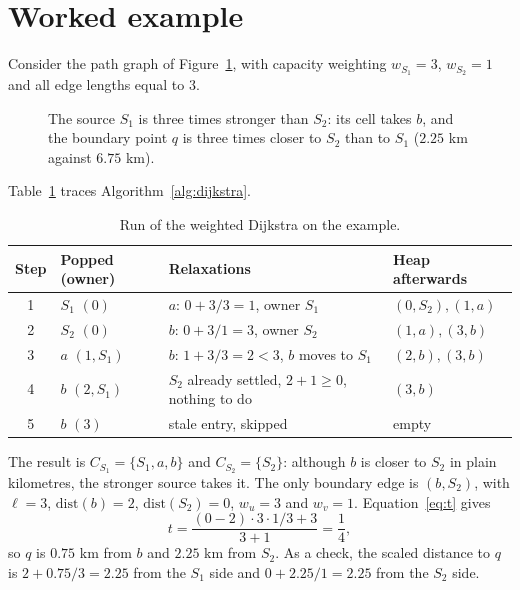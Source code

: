 \documentclass[11pt,a4paper]{article}
\theoremstyle{remark}
\newcommand{\dist}{\mathrm{dist}}
\begin{document}
\section{Worked example}

Consider the path graph of Figure~\ref{fig:example}, with capacity weighting
$w_{S_1}=3$, $w_{S_2}=1$ and all edge lengths equal to $3$.

\begin{figure}[H]
\centering
{}
\caption{The source $S_1$ is three times stronger than $S_2$: its cell takes
$b$, and the boundary point $q$ is three times closer to $S_2$ than to $S_1$
($2.25$ km against $6.75$ km).}
\label{fig:example}
\end{figure}

Table~\ref{tab:run} traces Algorithm~\ref{alg:dijkstra}.

\begin{table}[H]
\centering
\begin{tabular}{@{}clll@{}}
\toprule
Step & Popped (owner) & Relaxations & Heap afterwards \\
\midrule
1 & $S_1$ $(0)$         & $a$: $0+3/3=1$, owner $S_1$                    & $(0,S_2), (1,a)$ \\
2 & $S_2$ $(0)$         & $b$: $0+3/1=3$, owner $S_2$                    & $(1,a), (3,b)$ \\
3 & $a$ $(1, S_1)$      & $b$: $1+3/3=2<3$, $b$ moves to $S_1$            & $(2,b), (3,b)$ \\
4 & $b$ $(2, S_1)$      & $S_2$ already settled, $2+1\ge 0$, nothing to do & $(3,b)$ \\
5 & $b$ $(3)$           & stale entry, skipped                           & empty \\
\bottomrule
\end{tabular}
\caption{Run of the weighted Dijkstra on the example.}
\label{tab:run}
\end{table}

The result is $C_{S_1}=\{S_1,a,b\}$ and $C_{S_2}=\{S_2\}$: although $b$ is
closer to $S_2$ in plain kilometres, the stronger source takes it. The only
boundary edge is $(b,S_2)$, with $\ell=3$, $\dist(b)=2$, $\dist(S_2)=0$,
$w_u=3$ and $w_v=1$. Equation~\eqref{eq:t} gives
\[
t=\frac{(0-2)\cdot 3\cdot 1/3+3}{3+1}=\frac14,
\]
so $q$ is $0.75$ km from $b$ and $2.25$ km from $S_2$. As a check, the scaled
distance to $q$ is $2+0.75/3=2.25$ from the $S_1$ side and $0+2.25/1=2.25$
from the $S_2$ side.
\end{document}

